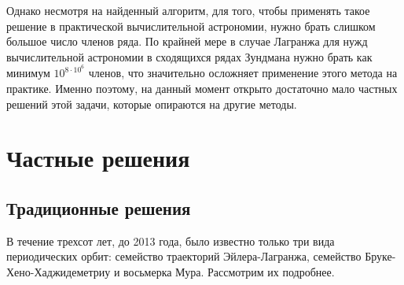\documentclass[a4paper, 12pt]{article}%
\begin{document}
Однако несмотря на найденный алгоритм, для того, чтобы применять такое решение в практической вычислительной астрономии, нужно брать слишком большое число членов ряда. По крайней мере в случае Лагранжа для нужд вычислительной астрономии в сходящихся рядах Зундмана нужно брать как минимум $10^{8\cdot10^6}$ членов, что значительно осложняет применение этого метода на практике. Именно поэтому, на данный момент открыто достаточно мало частных решений этой задачи, которые опираются на другие методы. 
\section{Частные решения}
\subsection{Традиционные решения}
В течение трехсот лет, до 2013 года, было известно только три вида периодических орбит: семейство траекторий Эйлера-Лагранжа, семейство Бруке-Хено-Хаджидеметриу и восьмерка Мура. Рассмотрим их подробнее.
\end{document}
